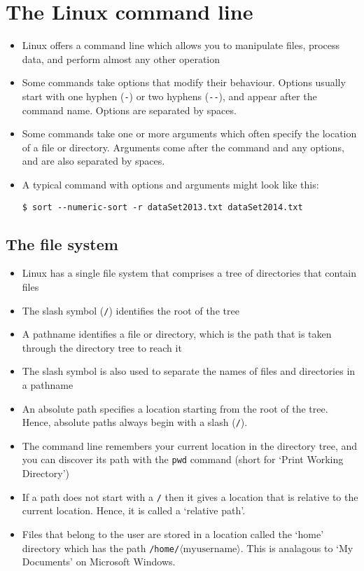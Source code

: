 \documentclass[a4paper,twoside]{memoir}
\newcommand{\shellcmd}{\texttt}
\newcommand{\shellvar}[1]{$\langle \text{#1}\rangle$}
\begin{document}
\tableofcontents*

\chapter{The Linux command line}

\begin{itemize}
\item Linux offers a command line which allows you to manipulate files, process data, and perform almost any other operation
\item Some commands take options that modify their behaviour.  Options usually start with one hyphen (\shellcmd{-}) or two hyphens (\shellcmd{-{}-}), and appear after the command name.  Options are separated by spaces.
\item Some commands take one or more arguments which often specify the location of a file or directory.  Arguments come after the command and any options, and are also separated by spaces.
\item A typical command with options and arguments might look like this:
\begin{verbatim}
$ sort --numeric-sort -r dataSet2013.txt dataSet2014.txt
\end{verbatim}
\end{itemize}

\section{The file system}
\begin{itemize}
\item Linux has a single file system that comprises a tree of directories that contain files
\item The slash symbol (\shellcmd{/}) identifies the root of the tree
\item A pathname identifies a file or directory, which is the path that is taken through the directory tree to reach it
\item The slash symbol is also used to separate the names of files and directories in a pathname
\item An absolute path specifies a location starting from the root of the tree.  Hence, absolute paths always begin with a slash (\shellcmd{/}).
\item The command line remembers your current location in the directory tree, and you can discover its path with the \shellcmd{pwd} command (short for `Print Working Directory')
\item If a path does not start with a \shellcmd{/} then it gives a location that is relative to the current location.  Hence, it is called a `relative path'.
\item Files that belong to the user are stored in a location called the `home' directory which has the path \shellcmd{/home/\shellvar{myusername}}.  This is analagous to `My Documents' on Microsoft Windows.
\end{itemize}
\end{document}
